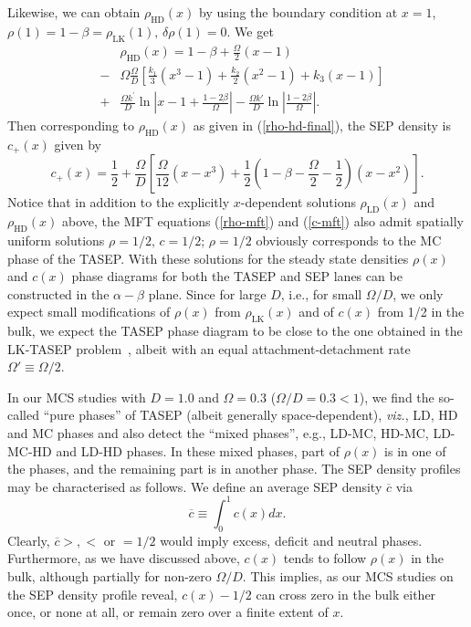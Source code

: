 \documentclass[aps,pre,twocolumn,superscriptaddress,amsmath,amssymb,longbibliography,floatfix]{revtex4}
\begin{document}
{Likewise, we can obtain $\rho_\text{HD}(x)$ by using the boundary condition at $x=1$, $\rho(1)=1-\beta=\rho_\text{LK}(1),\,\delta \rho(1)=0$. We get
 \begin{eqnarray}
 &&\rho_\text{HD}(x)=1-\beta+\frac{\Omega}{2}(x-1)\nonumber \\&-&\Omega\frac{\Omega}{D}[\frac{k_1}{3}(x^3-1)+\frac{k_2}{2}(x^2-1)+k_3(x-1)]\nonumber  \\
 &+&\frac{\Omega k^\prime}{D}\ln |x-1+\frac{1-2\beta}{\Omega}|-\frac{\Omega k'}{D}\ln |\frac{1-2\beta}{\Omega}|. \label{rho-hd-final}
\end{eqnarray}
Then corresponding to $\rho_\text{HD}(x)$ as given in (\ref{rho-hd-final}), the SEP density is $c_+(x)$ given by
\begin{equation}
 c_+(x)= \frac{1}{2} + \frac{\Omega}{D}\left[\frac{\Omega}{12}(x-x^3)+\frac{1}{2}(1-\beta-\frac{\Omega}{2}-\frac{1}{2})(x-x^2)\right].\label{c-plus}
\end{equation}
Notice that in addition to the explicitly $x$-dependent solutions $\rho_\text{LD}(x)$ and $\rho_\text{HD}(x)$ above, the MFT equations (\ref{rho-mft}) and (\ref{c-mft}) also admit spatially uniform solutions $\rho=1/2,\,c=1/2$; $\rho=1/2$ obviously corresponds to the MC phase of the TASEP.
With these solutions for the steady state densities $\rho(x)$ and $c(x)$ phase diagrams for both the TASEP and SEP lanes can be constructed in the $\alpha-\beta$ plane. Since for large $D$, i.e., for small $\Omega/D$, we only expect small modifications of $\rho(x)$ from $\rho_\text{LK}(x)$ and of $c(x)$ from 1/2 in the bulk, we expect the TASEP phase diagram to be close to the one obtained in the LK-TASEP problem~\cite{frey-lktasep}, albeit with an equal attachment-detachment rate $\Omega'\equiv \Omega/2$.  






In our MCS studies with $D=1.0$ and $\Omega=0.3$ ($\Omega/D=0.3 < 1$), we find the so-called ``pure phases'' of TASEP (albeit generally space-dependent), {\em viz.}, LD, HD and MC phases and also detect the ``mixed phases'', e.g., LD-MC, HD-MC, LD-MC-HD and LD-HD phases. In these mixed phases, part of $\rho(x)$ is in one of the phases, and the remaining part is in another phase. The SEP density profiles may be characterised as follows. We define an average SEP density $\overline c$ via
\begin{equation}
 \overline c\equiv \int_0^1 c(x) dx.\label{mean-sep}
\end{equation}
Clearly, $\overline c>,<$ or $=1/2$ would imply excess, deficit and neutral phases. Furthermore, as we have discussed above, $c(x)$ tends to follow $\rho(x)$ in the bulk, although partially for non-zero $\Omega/D$. This implies, as our MCS studies on the SEP density profile reveal, $c(x)-1/2$ can cross zero in the bulk either once, or none at all, or remain zero over a finite extent of $x$.

}
\end{document}
